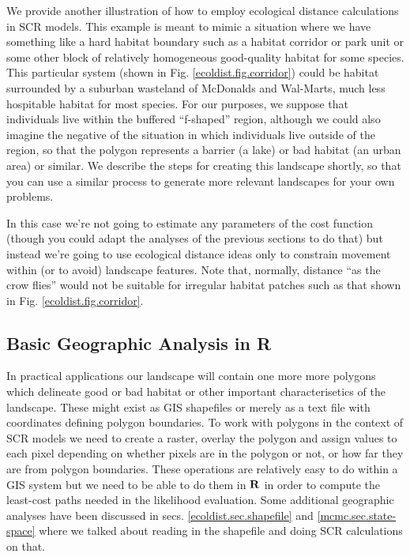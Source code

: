 We provide another illustration of how to employ ecological distance
calculations in SCR models. This example is meant to mimic 
a situation where we have something like a hard habitat boundary
such as a habitat corridor or park unit or some other block
of relatively homogeneous good-quality habitat for some species. This
particular system (shown in Fig. \ref{ecoldist.fig.corridor}) could
be habitat surrounded by a suburban wasteland of McDonalds and
Wal-Marts, much less hospitable habitat for most species.  For our
purposes, we suppose that individuals live within the buffered
``f-shaped'' 
region, although we could also imagine the negative of the
situation in which individuals live outside of the region, so that the
polygon represents a barrier (a lake) or bad habitat (an urban area)
or similar.  We describe the steps for creating this landscape
shortly, so that you can use a similar process to generate more
relevant landscapes for your own problems.

In this case we're not going to estimate any parameters of the cost
function (though you could adapt the analyses of the previous sections
to do that) but instead we're going to use ecological
distance ideas only to constrain movement within (or to avoid)
landscape features. Note that, normally, distance ``as the crow
flies'' would not be suitable for irregular habitat patches such as
that shown in Fig. \ref{ecoldist.fig.corridor}.  


\subsection{Basic Geographic Analysis in R}

In practical applications our landscape will contain one more more
polygons which delineate good or bad habitat or other important
characterisetics of the landscape.  These might exist as GIS
shapefiles or merely as a text file with coordinates defining polygon
boundaries. To work with polygons in the context of SCR models we need
to create a raster, overlay the polygon and assign values to each pixel
depending on whether pixels are in the polygon or not, or how far they
are from polygon boundaries. These operations are relatively easy to
do within a GIS system but we need to be able to do them in ${\bf R}$
in order to compute the least-cost paths needed in the likelihood
evaluation. Some additional geographic analyses have been discussed in
secs. \ref{ecoldist.sec.shapefile} and \ref{mcmc.sec.state-space}
where we talked about reading in the shapefile and doing SCR calculations
on that. 

